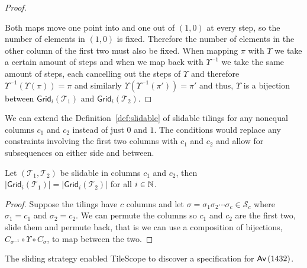 \begin{proof}
\begin{center}
\begin{tikzpicture}[scale=0.75]
\end{tikzpicture}
\end{center}
Both maps move one point into and one out of $(1,0)$ at every step, so the number of elements in $(1,0)$ is fixed. Therefore the number of elements in the other column of the first two must also be fixed. When mapping $\pi$ with $\Upsilon$ we take a certain amount of steps and when we map back with $\Upsilon^{-1}$ we take the same amount of steps, each cancelling out the steps of $\Upsilon$ and therefore $\Upsilon^{-1}(\Upsilon(\pi)) = \pi$ and similarly $\Upsilon\left(\Upsilon^{-1}(\pi')\right) = \pi'$ and thus, $\Upsilon$ is a bijection between $\textsf{Grid}_i(\mathcal{T}_1)$ and $\textsf{Grid}_i(\mathcal{T}_2)$.
\end{proof}

We can extend the Definition~\ref{def:slidable} of slidable tilings for any nonequal columns $c_1$ and $c_2$ instead of just $0$ and $1$. The conditions would replace any constraints involving the first two columns with $c_1$ and $c_2$ and allow for subsequences on either side and between.

\begin{proposition}
Let $(\mathcal{T}_1,\mathcal{T}_2)$ be slidable in columns $c_1$ and $c_2$, then $|\textsf{Grid}_i(\mathcal{T}_1)| = |\textsf{Grid}_i(\mathcal{T}_2)|$ for all $i\in\N$.
\end{proposition}
\begin{proof}
Suppose the tilings have $c$ columns and let $\sigma = \sigma_1\sigma_2 \cdots \sigma_c \in \mathcal{S}_c$ where $\sigma_1 = c_1$ and $\sigma_2 = c_2$. We can permute the columns so $c_1$ and $c_2$ are the first two, slide them and permute back, that is we can use a composition of bijections, $C_{\sigma^{-1}} \circ \Upsilon \circ C_\sigma$, to map between the two.
\end{proof}

The sliding strategy enabled TileScope to discover a specification for $\Av{1432}$.